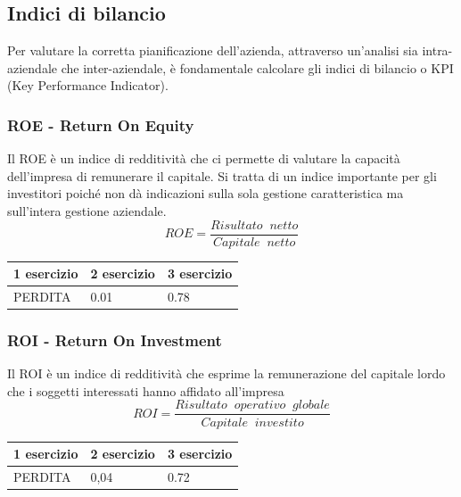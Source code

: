 \documentclass[12pt, a4paper]{article}
\begin{document}
\subsection{Indici di bilancio}
Per valutare la corretta pianificazione dell'azienda, attraverso un'analisi sia intra- aziendale che inter-aziendale, è fondamentale calcolare gli indici di bilancio o KPI (Key Performance Indicator).

\subsubsection*{ROE - Return On Equity}
Il ROE è un indice di redditività che ci permette di valutare la capacità dell'impresa di remunerare il capitale. Si tratta di un indice importante per gli investitori poiché non dà indicazioni sulla sola gestione caratteristica ma sull'intera gestione aziendale.
$$ ROE = \frac{Risultato \;\; netto}{Capitale \;\; netto}$$
\begin{center}
    \begin{tabular}{|l|l|l|}
        \hline
        \rowcolor[HTML]{CBCEFB}
        1 esercizio & 2 esercizio & 3 esercizio \\ \hline
        PERDITA     & 0.01        & 0.78        \\ \hline
    \end{tabular}
\end{center}

\subsubsection*{ROI - Return On Investment}
Il ROI è un indice di redditività che esprime la remunerazione del capitale lordo che i soggetti interessati hanno affidato all'impresa
$$ ROI = \frac{Risultato \;\; operativo \;\; globale}{Capitale \;\; investito}$$
\begin{center}
    \begin{tabular}{|l|l|l|}
        \hline
        \rowcolor[HTML]{CBCEFB}
        1 esercizio & 2 esercizio & 3 esercizio \\ \hline
        PERDITA     & 0,04        & 0.72        \\ \hline
    \end{tabular}
\end{center}
\end{document}
